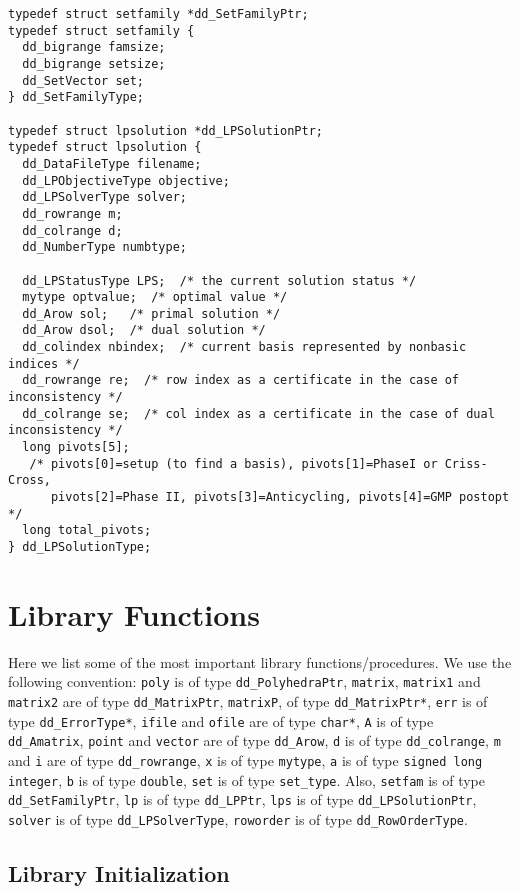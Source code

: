 \documentclass[11pt]{article}
\newcommand {\0} {{\bf 0}}
\begin{document}
\begin{verbatim}
typedef struct setfamily *dd_SetFamilyPtr;
typedef struct setfamily {
  dd_bigrange famsize;
  dd_bigrange setsize;
  dd_SetVector set;
} dd_SetFamilyType;

typedef struct lpsolution *dd_LPSolutionPtr;
typedef struct lpsolution {
  dd_DataFileType filename;
  dd_LPObjectiveType objective;
  dd_LPSolverType solver;
  dd_rowrange m;
  dd_colrange d;
  dd_NumberType numbtype;

  dd_LPStatusType LPS;  /* the current solution status */
  mytype optvalue;  /* optimal value */
  dd_Arow sol;   /* primal solution */
  dd_Arow dsol;  /* dual solution */
  dd_colindex nbindex;  /* current basis represented by nonbasic indices */
  dd_rowrange re;  /* row index as a certificate in the case of inconsistency */
  dd_colrange se;  /* col index as a certificate in the case of dual inconsistency */
  long pivots[5];
   /* pivots[0]=setup (to find a basis), pivots[1]=PhaseI or Criss-Cross,
      pivots[2]=Phase II, pivots[3]=Anticycling, pivots[4]=GMP postopt  */
  long total_pivots;
} dd_LPSolutionType;

\end{verbatim}

\section{Library Functions}  \label{LIBRARY}

Here we list some of the most important library functions/procedures.
We use the following convention:
{\tt poly} is of type {\tt dd\_PolyhedraPtr},
{\tt matrix}, {\tt matrix1} and {\tt matrix2} are of type {\tt dd\_MatrixPtr},
{\tt matrixP}, of type {\tt dd\_MatrixPtr*},
{\tt err} is of type {\tt dd\_ErrorType*},
{\tt ifile} and {\tt ofile} are of type {\tt char*},
{\tt A} is of type {\tt dd\_Amatrix},
{\tt point} and {\tt vector} are of type {\tt dd\_Arow},
{\tt d} is of type {\tt dd\_colrange},
{\tt m} and {\tt i} are of type {\tt dd\_rowrange},
{\tt x} is of type {\tt mytype},
{\tt a} is of type {\tt signed long integer},
{\tt b} is of type {\tt double},
{\tt set} is of type {\tt set\_type}.
  Also,
{\tt setfam} is of type {\tt dd\_SetFamilyPtr},
{\tt lp} is of type {\tt dd\_LPPtr},
{\tt lps} is of type {\tt dd\_LPSolutionPtr},
{\tt solver} is of type {\tt dd\_LPSolverType},
{\tt roworder} is of type {\tt dd\_RowOrderType}.


\subsection{Library Initialization}  \label{Initialization}
\end{document}

